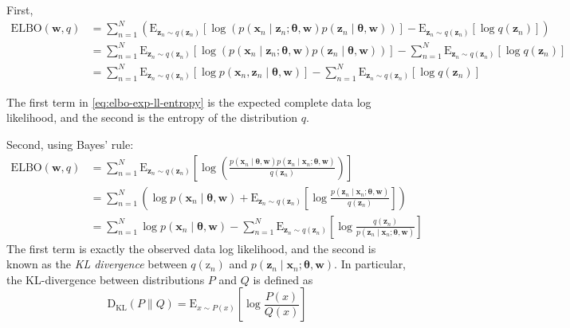 First, 
\begin{align}
    \mathrm{ELBO}(\mathbf{w}, q) &= \sum_{n = 1} ^N \left(\mathrm{E}_{\mathbf{z}_n \sim q(\mathbf{z}_n)} \left[\log\left(p(\mathbf{x}_n \mid \mathbf{z}_n; \boldsymbol\theta, \mathbf{w}) p(\mathbf{z}_n \mid \boldsymbol\theta, \mathbf{w} ) \right)\right] - \mathrm{E}_{\mathbf{z}_n \sim q(\mathbf{z}_n)} [\log q(\mathbf{z}_n)]\right)\nonumber \\
    &= \sum_{n = 1} ^N \mathrm{E}_{\mathbf{z}_n \sim q(\mathbf{z}_n)} \left[\log\left(p(\mathbf{x}_n \mid \mathbf{z}_n; \boldsymbol\theta, \mathbf{w}) p(\mathbf{z}_n \mid \boldsymbol\theta, \mathbf{w} ) \right)\right] - \sum_{n = 1} ^N \mathrm{E}_{\mathbf{z}_n \sim q(\mathbf{z}_n)} [\log q(\mathbf{z}_n)]\nonumber \\
    &= \sum_{n = 1} ^N \mathrm{E}_{\mathbf{z}_n \sim q(\mathbf{z}_n)} \left[\log p(\mathbf{x}_n, \mathbf{z}_n \mid \boldsymbol\theta, \mathbf{w})\right] - \sum_{n = 1} ^N \mathrm{E}_{\mathbf{z}_n \sim q(\mathbf{z}_n)} [\log q(\mathbf{z}_n)] \label{eq:elbo-exp-ll-entropy}
\end{align}

The first term in \eqref{eq:elbo-exp-ll-entropy} is the expected complete data log likelihood, and the second is the entropy of the distribution $q$. 

Second, using Bayes' rule:
\begin{align}
    \mathrm{ELBO}(\mathbf{w}, q) &= \sum_{n = 1} ^N \mathrm{E}_{\mathbf{z}_n \sim q(\mathbf{z}_n)} \left[\log\left(\frac{p(\mathbf{x}_n \mid \boldsymbol{\theta}, \mathbf{w}) p(\mathbf{z}_n \mid \mathbf{x}_n; \boldsymbol{\theta}, \mathbf{w})}{q(\mathbf{z}_n)}\right)\right]\nonumber \\
    &= \sum_{n = 1} ^N \left(\log p(\mathbf{x}_n \mid \boldsymbol{\theta}, \mathbf{w}) + \mathrm{E}_{\mathbf{z}_n \sim q(\mathbf{z}_n)} \left[\log\frac{p(\mathbf{z}_n \mid \mathbf{x}_n; \boldsymbol{\theta}, \mathbf{w})}{q(\mathbf{z}_n)}\right]\right)\nonumber \\
    &= \sum_{n = 1} ^N \log p(\mathbf{x}_n \mid \boldsymbol{\theta}, \mathbf{w}) - \sum_{n = 1} ^N \mathrm{E}_{\mathbf{z}_n \sim q(\mathbf{z}_n)} \left[\log\frac{q(\mathbf{z}_n)}{p(\mathbf{z}_n \mid \mathbf{x}_n; \boldsymbol{\theta}, \mathbf{w})}\right]\label{eq:elbo-obs-ll-kl}
\end{align}
The first term is exactly the observed data log likelihood, and the second is known as the \textit{KL divergence} between $q(\mathrm{z}_n)$ and $p(\mathbf{z}_n \mid \mathbf{x}_n; \boldsymbol{\theta}, \mathbf{w})$. In particular, the KL-divergence between distributions $P$ and $Q$ is defined as
\begin{equation}
    \mathrm{D}_{\text{KL}}(P \| Q) = \mathrm{E}_{x \sim P(x)} \left[\log \frac{P(x)}{Q(x)}\right]
\end{equation}

